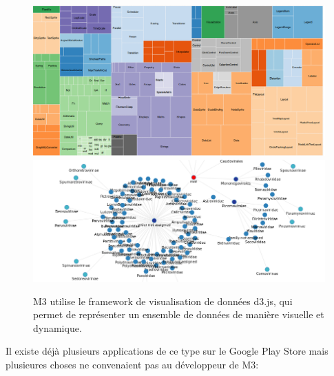\documentclass[11pt,a4paper,margin=0.5in]{report}
\begin{document}
\begin{figure}[!ht]
  \centering
    \includegraphics[width=1\textwidth]{d31.png} \\[0.25in]
  \centering
    \includegraphics[width=1\textwidth]{d33.png} \\[0.25in]
  \caption{M3 utilise le framework de visualisation de données d3.js, qui permet de représenter un ensemble de données de manière visuelle et dynamique.}
\end{figure}

\clearpage

Il existe déjà plusieurs applications de ce type sur le Google Play Store mais plusieures choses ne convenaient
pas au développeur de M3:
\end{document}
